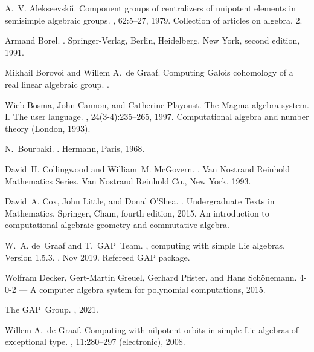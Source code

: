 \documentclass[a4paper,10pt]{amsart}
\numberwithin{equation}{section}
\theoremstyle{remark}
\theoremstyle{remark}
\begin{document}
\begin{thebibliography}{10}

A.~V. Alekseevski\u{\i}.
\newblock Component groups of centralizers of unipotent elements in semisimple
  algebraic groups.
,
  62:5--27, 1979.
\newblock Collection of articles on algebra, 2.

Armand Borel.
.
\newblock Springer-Verlag, Berlin, Heidelberg, New York, second edition, 1991.

Mikhail Borovoi and Willem A.~de Graaf.
\newblock Computing {G}alois cohomology of a real linear algebraic group.
.

Wieb Bosma, John Cannon, and Catherine Playoust.
\newblock The {M}agma algebra system. {I}. {T}he user language.
, 24(3-4):235--265, 1997.
\newblock Computational algebra and number theory (London, 1993).

N.~Bourbaki.
.
\newblock Hermann, Paris, 1968.

David~H. Collingwood and William~M. McGovern.
.
\newblock Van Nostrand Reinhold Mathematics Series. Van Nostrand Reinhold Co.,
  New York, 1993.

David~A. Cox, John Little, and Donal O'Shea.
.
\newblock Undergraduate Texts in Mathematics. Springer, Cham, fourth edition,
  2015.
\newblock An introduction to computational algebraic geometry and commutative
  algebra.

W.~A. de~Graaf and T.~GAP~Team.
, computing with simple {L}ie algebras, {V}ersion 1.5.3.
, Nov 2019.
\newblock Refereed GAP package.

Wolfram Decker, Gert-Martin Greuel, Gerhard Pfister, and Hans Sch\"onemann.
 {4-0-2} --- {A} computer algebra system for polynomial
  computations, 2015.

The GAP~Group.
,
  2021.

Willem A.~de Graaf.
\newblock Computing with nilpotent orbits in simple {L}ie algebras of
  exceptional type.
, 11:280--297 (electronic), 2008.


\end{thebibliography}
\end{document}
